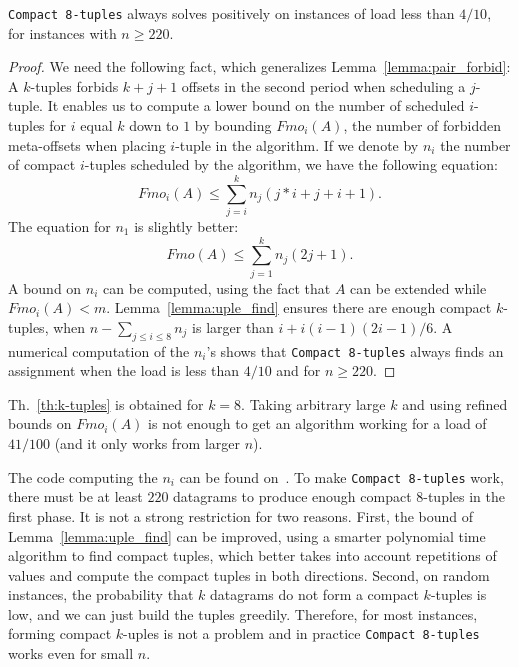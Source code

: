 \begin{theorem}\label{th:k-tuples}
\texttt{Compact 8-tuples} always solves \pma positively on instances of load less than $4/10$, for instances with $n \geq 220$.
\end{theorem}
\begin{proof}
We need the following fact, which generalizes Lemma~\ref{lemma:pair_forbid}: A $k$-tuples forbids $k+j+1$ offsets in the second period when scheduling a $j$-tuple. %
It enables us to compute a lower bound on the number of scheduled $i$-tuples for $i$ equal $k$ down to $1$ by bounding $Fmo_i(A)$, the number of forbidden meta-offsets when placing $i$-tuple in the algorithm.
If we denote by $n_i$ the number of compact $i$-tuples scheduled by the algorithm,
we have the following equation:  $$ Fmo_i(A) \leq \displaystyle{\sum_{j=i}^k n_j(j*i + j + i+ 1)}.$$
The equation for $n_1$ is slightly better: 
$$ Fmo(A) \leq \displaystyle{\sum_{j=1}^k n_j(2j + 1)}.$$
A bound on $n_i$ can be computed, using the fact that $A$ can be extended while $Fmo_i(A) < m$. 
Lemma~\ref{lemma:uple_find} ensures there are enough compact $k$-tuples, when $n - \sum_{j \leq i \leq 8} n_j$ is larger than $i + i(i-1)(2i-1)/6$. 
A numerical computation of the $n_i$'s shows that \texttt{Compact 8-tuples} always finds an assignment when the load is less than $4/10$ and for $n \geq 220$.
\end{proof}

Th.~\ref{th:k-tuples} is obtained for $k=8$. Taking arbitrary large $k$ and using refined bounds on $Fmo_i(A)$ is not enough to get an algorithm working for a load of $41/100$ (and it only works from larger $n$).

The code computing the $n_i$ can be found on~\cite{webpage}.
To make \texttt{Compact 8-tuples} work, there must be at least $220$ datagrams to
produce enough compact $8$-tuples in the first phase. It is not a strong restriction for two reasons. First, the bound of Lemma~\ref{lemma:uple_find} can be improved, using a smarter polynomial time algorithm to find compact tuples, which better takes into account repetitions of values and compute the compact tuples in both directions. Second, on random instances, the probability that $k$ datagrams do not form a compact $k$-tuples is low, and we can just build the tuples greedily. Therefore, for most instances, forming compact $k$-uples is not a problem and in practice \texttt{Compact 8-tuples} works even for small $n$.



